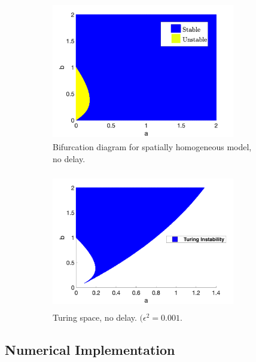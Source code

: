 \begin{figure}[H]
    \centering
    \begin{subfigure}[b]{0.45\textwidth}
        \centering
        \includegraphics[width=8cm,height = 6cm]{bifsh.png}
        \caption{Bifurcation diagram for spatially homogeneous model, no delay.}
        \label{fig:bifsh}
    \end{subfigure}
    \hfill
    \begin{subfigure}[b]{0.45\textwidth}
        \centering
        \includegraphics[width=8cm,height = 6cm]{turingspace.png}
        \caption{Turing space, no delay. $(\epsilon^2=0.001$.}
        \label{fig:turingspace}
    \end{subfigure}
    \caption{}
    \label{fig:dispfixed}
\end{figure}

\subsection{Numerical Implementation}\label{section:numimp}
